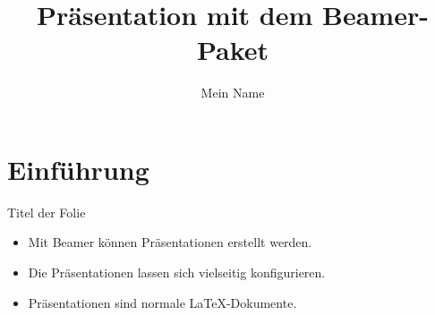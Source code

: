 \documentclass{beamer}
\title{Präsentation mit dem Beamer-Paket}
\author{Mein Name}
\begin{document}
\maketitle

\begin{frame}{}
  \tableofcontents
\end{frame}

\section{Einführung}

\begin{frame}{Titel der Folie}
  \begin{itemize}
    \item<1-> Mit Beamer können Präsentationen erstellt werden.
    \item<2-> Die Präsentationen lassen sich vielseitig konfigurieren.
    \item<3-> Präsentationen sind normale \LaTeX-Dokumente.
  \end{itemize}
\end{frame}
\end{document}
